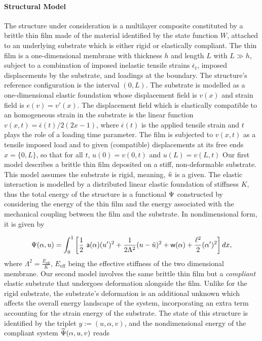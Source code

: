\documentclass[10pt]{article}
\begin{document}
\paragraph{Structural Model}
The structure under consideration is a multilayer composite constituted by a brittle thin film  made of the material identified by the state function $W$, attached to an underlying substrate which is either rigid or elastically compliant. The thin film is a one-dimensional membrane with thickness $h$ and length $L$ with $L\gg h$, subject to a combination of imposed inelastic tensile strains $\bar\epsilon_t$, imposed displacements by the substrate, and loadings at the boundary. The structure's reference configuration is the interval $(0, L)$. 
%
The substrate is modelled as a one-dimensional elastic foundation whose displacement field is $v(x)$ and strain field is $e(v) = v'(x)$. 
%
The displacement field which is elastically compatible to an homogeneous strain in the substrate is the linear function $v(x, t) = \bar\epsilon(t)/2 (2x-1)$, where $\bar\epsilon(t)$ is the applied tensile strain and $t$ plays the role of a loading time parameter. 
%
The film is subjected to $v(x, t)$ as a tensile imposed load and to given (compatible) displacements at its free ends $x = \{0, L\}$, so that for all $t$, $u(0)=v(0, t)$ and $u(L)=v(L, t)$
%
Our first model describes a brittle thin film deposited on a stiff, non-deformable substrate. This model assumes the substrate is rigid, meaning, $\tilde u$ is a given. The elastic interaction is modelled by a distributed linear elastic foundation of stiffness $K$, thus
%
the total energy of the structure is a functional $\Psi$ constructed by considering the energy of the thin film and the energy associated with  the mechanical coupling between the film and the substrate. In nondimensional form, it is given by

\begin{equation}
    \label{def:energy_stiff}
    \Psi(\alpha, u) = \int_{0}^{1} \left[ \frac{1}{2} \ \soften(\alpha)(u')^2 
    + \frac{1}{2 \elastell^2} (u-\subsu)^2
    + \homogdiss(\alpha) + \frac{\damagell^2}{2}(\alpha')^2 
     \right] dx,
\end{equation}
where $\Lambda^2 = \frac{E_{\text{eff}}}{K}$, $E_{\text{eff}}$ being the effective stiffness of the two dimensional membrane.
Our second model involves the same brittle thin film but a \emph{compliant} elastic substrate that undergoes deformation alongside the film. Unlike for the rigid substrate, the substrate's deformation is an additional unknown which affects the overall energy landscape of the system, incorporating an extra term accounting for the strain energy of the substrate. 
The state of this structure is identified by the triplet $y:=(u, \alpha, v)$, and the nondimensional energy of the compliant system  $\widetilde\Psi(\alpha, u, v)$ reads
\end{document}
